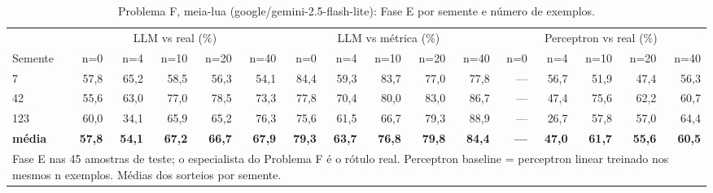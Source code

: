 \begin{table}[htbp]
\centering
\footnotesize
\caption{Problema F, meia-lua (google/gemini-2.5-flash-lite): Fase E por semente e número de exemplos.}
\label{tab:bloco2_F_meialua_faseE_nshot_flashlite}
\begin{tabular}{lrrrrrrrrrrrrrrr}
\toprule
 & \multicolumn{5}{c}{LLM vs real (\%)} & \multicolumn{5}{c}{LLM vs métrica (\%)} & \multicolumn{5}{c}{Perceptron vs real (\%)} \\ \cmidrule(lr){2-6} \cmidrule(lr){7-11} \cmidrule(lr){12-16}
Semente & n=0 & n=4 & n=10 & n=20 & n=40 & n=0 & n=4 & n=10 & n=20 & n=40 & n=0 & n=4 & n=10 & n=20 & n=40 \\
\midrule
7 & 57,8 & 65,2 & 58,5 & 56,3 & 54,1 & 84,4 & 59,3 & 83,7 & 77,0 & 77,8 & — & 56,7 & 51,9 & 47,4 & 56,3 \\
42 & 55,6 & 63,0 & 77,0 & 78,5 & 73,3 & 77,8 & 70,4 & 80,0 & 83,0 & 86,7 & — & 47,4 & 75,6 & 62,2 & 60,7 \\
123 & 60,0 & 34,1 & 65,9 & 65,2 & 76,3 & 75,6 & 61,5 & 66,7 & 79,3 & 88,9 & — & 26,7 & 57,8 & 57,0 & 64,4 \\
\midrule
\textbf{média} & \textbf{57,8} & \textbf{54,1} & \textbf{67,2} & \textbf{66,7} & \textbf{67,9} & \textbf{79,3} & \textbf{63,7} & \textbf{76,8} & \textbf{79,8} & \textbf{84,4} & \textbf{—} & \textbf{47,0} & \textbf{61,7} & \textbf{55,6} & \textbf{60,5} \\
\bottomrule
\multicolumn{16}{p{0.95\linewidth}}{\footnotesize Fase E nas 45 amostras de teste; o especialista do Problema F é o rótulo real. Perceptron baseline = perceptron linear treinado nos mesmos n exemplos. Médias dos sorteios por semente.} \\
\end{tabular}
\end{table}
